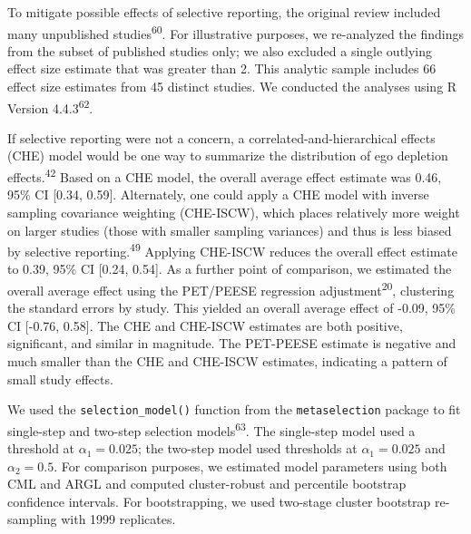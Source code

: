 \documentclass[
  american,
  man, donotrepeattitle,floatsintext]{apa7}
\begin{document}
To mitigate possible effects of selective reporting, the original review included many unpublished studies\textsuperscript{60}.
For illustrative purposes, we re-analyzed the findings from the subset of published studies only; we also excluded a single outlying effect size estimate that was greater than 2. This analytic sample includes 66 effect size estimates from 45 distinct studies.
We conducted the analyses using R Version 4.4.3\textsuperscript{62}.

If selective reporting were not a concern, a correlated-and-hierarchical effects (CHE) model would be one way to summarize the distribution of ego depletion effects.\textsuperscript{42}
Based on a CHE model, the overall average effect estimate was 0.46, 95\% CI {[}0.34, 0.59{]}.
Alternately, one could apply a CHE model with inverse sampling covariance weighting (CHE-ISCW), which places relatively more weight on larger studies (those with smaller sampling variances) and thus is less biased by selective reporting.\textsuperscript{49}
Applying CHE-ISCW reduces the overall effect estimate to 0.39, 95\% CI {[}0.24, 0.54{]}.
As a further point of comparison, we estimated the overall average effect using the PET/PEESE regression adjustment\textsuperscript{20}, clustering the standard errors by study. This yielded an overall average effect of -0.09, 95\% CI {[}-0.76, 0.58{]}. The CHE and CHE-ISCW estimates are both positive, significant, and similar in magnitude. The PET-PEESE estimate is negative and much smaller than the CHE and CHE-ISCW estimates, indicating a pattern of small study effects.

We used the \texttt{selection\_model()} function from the \texttt{metaselection} package to fit single-step and two-step selection models\textsuperscript{63}.
The single-step model used a threshold at \(\alpha_1 = 0.025\); the two-step model used thresholds at \(\alpha_1 = 0.025\) and \(\alpha_2 = 0.5\).
For comparison purposes, we estimated model parameters using both CML and ARGL and computed cluster-robust and percentile bootstrap confidence intervals.
For bootstrapping, we used two-stage cluster bootstrap re-sampling with 1999 replicates.
\end{document}
